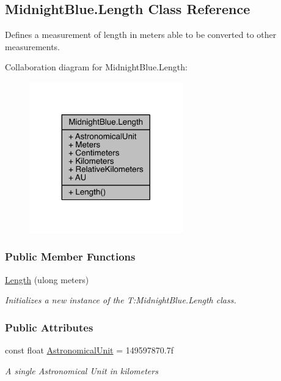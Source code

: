 \hypertarget{class_midnight_blue_1_1_length}{}\subsection{Midnight\+Blue.\+Length Class Reference}
\label{class_midnight_blue_1_1_length}


Defines a measurement of length in meters able to be converted to other measurements.  




Collaboration diagram for Midnight\+Blue.\+Length\+:\nopagebreak
\begin{figure}[H]
\begin{center}
\leavevmode
\includegraphics[width=188pt]{class_midnight_blue_1_1_length__coll__graph}
\end{center}
\end{figure}
\subsubsection*{Public Member Functions}
\begin{DoxyCompactItemize}
\item 
\hyperlink{class_midnight_blue_1_1_length_a8c58b161c6f730c22d84b01b078bd091}{Length} (ulong meters)
\begin{DoxyCompactList}\small\item\em Initializes a new instance of the T\+:\+Midnight\+Blue.\+Length class. \end{DoxyCompactList}\end{DoxyCompactItemize}
\subsubsection*{Public Attributes}
\begin{DoxyCompactItemize}
\item 
const float \hyperlink{class_midnight_blue_1_1_length_a5e86fa7e1d296ca9e6c5406a863427a6}{Astronomical\+Unit} = 149597870.\+7f
\begin{DoxyCompactList}\small\item\em A single Astronomical Unit in kilometers \end{DoxyCompactList}\end{DoxyCompactItemize}
